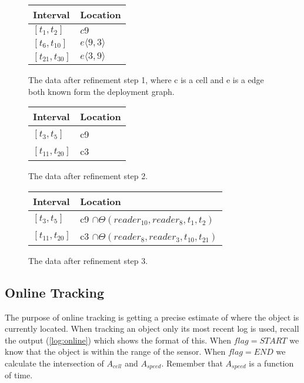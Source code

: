 \begin{figure}
\begin{minipage}[tbh]{\columnwidth}

  \vspace*{\fill}
  \centering
		\begin{tabular}{ l  l  }
		\toprule
		\textbf{Interval} & \textbf{Location}\\ 
		\midrule
		$[t_1,t_2]$ & $c9$ \\ 

		$[t_6,t_{10}]$ &  $e\langle9,3\rangle$\\ 

		$[t_{21},t_{30}]$ &  $ e\langle3,9\rangle $\\ 
		\bottomrule
		\end{tabular}
  \caption{The data after refinement step 1, where c is a cell and e is a edge both known form the deployment graph.}
  \label{fig:ref1} \par\vfill
	
	
		\begin{tabular}{  l  l  }
		\toprule
		\textbf{Interval} & \textbf{Location}\\ 
		\midrule
		$[t_3,t_5]$ & c9 \\ 

		$[t_{11},t_{20}]$ &  c3\\ 
		\bottomrule
		\end{tabular}
  \caption{The data after refinement step 2.}
  \label{fig:ref2}
	
		\begin{tabular}{  l  l  }
		\toprule
		\textbf{Interval} & \textbf{Location}\\ 
		\midrule
		$[t_3,t_5]$ & c9 $\cap \Theta(reader_10,reader_8,t_1,t_2)$ \\ 

		$[t_{11},t_{20}]$ &  c3 $\cap \Theta(reader_8,reader_3,t_{10},t_{21})$\\ 
		\hline
		\end{tabular}
			
	\caption{The data after refinement step 3. }
  \label{fig:ref3}

\end{minipage}
\end{figure}


\subsection{Online Tracking}
\label{sub:online}
The purpose of online tracking is getting a precise estimate of where the object is currently located.
When tracking an object only its most recent log is used, recall the output (\ref{log:online}) which shows the format of this.
When $flag=START$ we know that the object is within the range of the sensor.
When $flag=END$ we calculate the intersection of $A_{cell}$ and $A_{speed}$. 
Remember that $A_{speed}$ is a function of time.  
